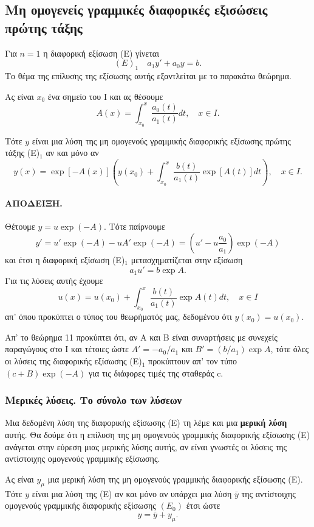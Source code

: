 \documentclass[11pt,a4paper,twoside]{book}
\newcommand{\titlefont}[1]{{\fontfamily{maksf}\selectfont #1}}
\newcounter{thewrhma}[chapter]
\renewcommand{\thethewrhma}{\thechapter.\arabic{thewrhma}}
\newcommand{\thewr}{\refstepcounter{thewrhma}{\bf\titlefont{\textcolor{secondarycolor}{\large Θεώρημα\hspace{2mm}\thethewrhma}}}\hspace{1mm}}{}
\newenvironment{Thewrhma}[1]
{\begin{tcolorbox}[title=\thewr\ \ :\ \  {\textcolor{black}{\bf{\large\titlefont{#1}}}},
breakable,
enhanced standard,
titlerule=-.2pt,
toprule=0pt, 
rightrule=0pt, 
bottomrule=0pt,
colback=white,
left=2mm,
top=1mm,
bottom=0mm,
boxrule=0pt,
colframe=white,
borderline west={1.5mm}{0pt}{secondarycolor},
leftrule=2mm,
sharp corners,
coltitle=secondarycolor]}
{\end{tcolorbox}}
\begin{document}
\subsection{Μη ομογενείς γραμμικές διαφορικές εξισώσεις πρώτης τάξης}
Για $n=1$ η διαφορική εξίσωση (Ε) γίνεται
\[
    (E)_1 \quad a_1 y' + a_0 y = b.
\]
Το θέμα της επίλυσης της εξίσωσης αυτής εξαντλείται με το παρακάτω θεώρημα.
\begin{Thewrhma}{11}
Ας είναι $x_0$ ένα σημείο του Ι και ας θέσουμε
\[
    A(x) = \int_{x_0}^x \frac{a_0(t)}{a_1(t)} dt, \quad x\in I.
\]

Τότε $y$ είναι μια λύση της μη ομογενούς γραμμικής διαφορικής εξίσωσης πρώτης τάξης (Ε)$_1$ αν και μόνο αν
\[
    y(x) = \exp[-A(x)] \left( y(x_0) + \int_{x_0}^x \frac{b(t)}{a_1(t)} \exp[A(t)] dt \right), \quad x\in I.
\]
\end{Thewrhma}
\paragraph{ΑΠΟΔΕΙΞΗ.} Θέτουμε $y = u \exp(-A)$. Τότε παίρνουμε
\[
    y' = u' \exp(-A) - u A' \exp(-A) = (u' - u \frac{a_0}{a_1}) \exp(-A)
\]
και έτσι η διαφορική εξίσωση (Ε)$_1$ μετασχηματίζεται στην εξίσωση
\[
    a_1 u' = b \exp A.
\]
Για τις λύσεις αυτής έχουμε
\[
    u(x) = u(x_0) + \int_{x_0}^x \frac{b(t)}{a_1(t)} \exp A(t) dt, \quad x\in I
\]
απ' όπου προκύπτει ο τύπος του θεωρήματός μας, δεδομένου ότι $y(x_0)=u(x_0)$.

Απ' το θεώρημα 11 προκύπτει ότι, αν Α και Β είναι συναρτήσεις με συνεχείς παραγώγους στο Ι και τέτοιες ώστε $A'=-a_0/a_1$ και $B'=(b/a_1)\exp A$, τότε όλες οι λύσεις της διαφορικής εξίσωσης (Ε)$_1$ προκύπτουν απ' τον τύπο $(c+B)\exp(-A)$ για τις διάφορες τιμές της σταθεράς c.

\subsubsection{Μερικές λύσεις. Το σύνολο των λύσεων}
Μια δεδομένη λύση της διαφορικής εξίσωσης (Ε) τη λέμε και μια \textbf{μερική λύση} αυτής. Θα δούμε ότι η επίλυση της μη ομογενούς γραμμικής διαφορικής εξίσωσης (Ε) ανάγεται στην εύρεση μιας μερικής λύσης αυτής, αν είναι γνωστές οι λύσεις της αντίστοιχης ομογενούς γραμμικής εξίσωσης.

\begin{Thewrhma}{12}
Ας είναι $y_\mu$ μια μερική λύση της μη ομογενούς γραμμικής διαφορικής εξίσωσης (Ε). Τότε $y$ είναι μια λύση της (Ε) αν και μόνο αν υπάρχει μια λύση $\bar{y}$ της αντίστοιχης ομογενούς γραμμικής διαφορικής εξίσωσης $(E_0)$ έτσι ώστε
\[
    y = \bar{y} + y_\mu.
\]
\end{Thewrhma}
\end{document}
